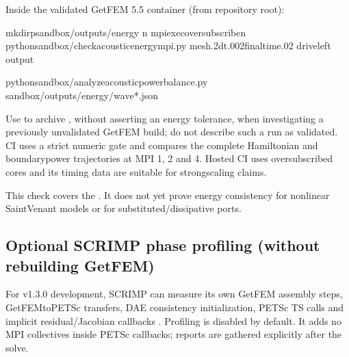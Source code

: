 \documentclass[letterpaper,10pt,english]{sphinxmanual}
\begin{document}
\sphinxAtStartPar
Inside the validated GetFEM 5.5 container (from repository root):

\begin{sphinxVerbatim}[commandchars=\\\{\}]
mkdir\PYGZhy{}psandbox/outputs/energy
n
mpiexec\PYGZhy{}\PYGZhy{}oversubscribe\PYGZhy{}n
pythonsandbox/check\PYGZus{}acoustic\PYGZus{}energy\PYGZus{}mpi.py
\PYGZhy{}\PYGZhy{}mesh.2\PYGZhy{}\PYGZhy{}dt.002\PYGZhy{}\PYGZhy{}final\PYGZhy{}time.02
\PYGZhy{}\PYGZhy{}drive\PYGZhy{}left
\PYGZhy{}\PYGZhy{}output

pythonsandbox/analyze\PYGZus{}acoustic\PYGZus{}power\PYGZus{}balance.py
sandbox/outputs/energy/wave\PYGZus{}*.json
\end{sphinxVerbatim}

\sphinxAtStartPar
Use  to archive , without
asserting an energy tolerance, when investigating a previously
unvalidated GetFEM build; do not describe such a run as validated.
CI uses a strict numeric gate and compares the complete Hamiltonian
and boundary\sphinxhyphen{}power trajectories at MPI 1, 2 and 4. Hosted CI uses
oversubscribed cores and its timing data are  suitable for
strong\sphinxhyphen{}scaling claims.

\sphinxAtStartPar
This check covers the . It does
not yet prove energy consistency for nonlinear Saint\sphinxhyphen{}Venant models
or for substituted/dissipative ports.


\subsection{Optional SCRIMP phase profiling (without rebuilding GetFEM)}
\label{\detokenize{install:optional-scrimp-phase-profiling-without-rebuilding-getfem}}
\sphinxAtStartPar
For v1.3.0 development, SCRIMP can measure its own GetFEM assembly
steps, GetFEM\sphinxhyphen{}to\sphinxhyphen{}PETSc transfers, DAE consistency initialization,
PETSc TS calls and implicit residual/Jacobian callbacks .
Profiling is disabled by default. It adds no MPI collectives inside
PETSc callbacks; reports are gathered explicitly after the solve.
\end{document}
